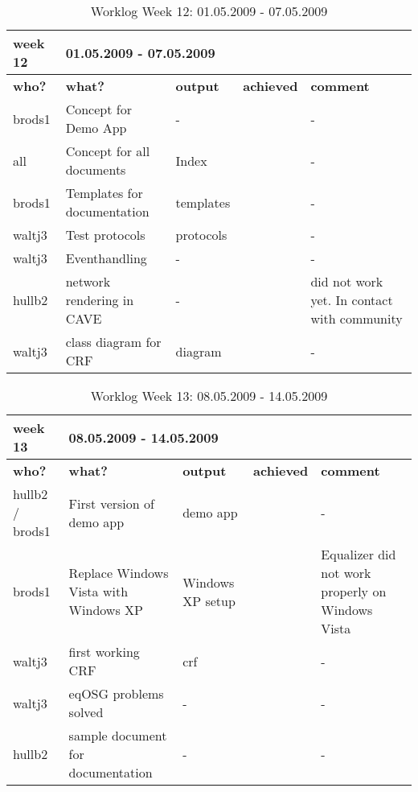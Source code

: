 \begin{table}[H]
	\centering
	\begin{tabular}{|b{}|p{}|p{}|p{}|p{}|}
		\hline \bfseries week 12 & \multicolumn{4}{l|}{\bfseries 01.05.2009 - 07.05.2009} \\
		\hline
		\hline \bfseries who? & \bfseries what? & \bfseries output & \bfseries achieved & \bfseries comment \\ 
		\hline brods1 & Concept for Demo App & \quad\quad- & \tick & \quad\quad- \\
		\hline all & Concept for all documents & Index & \tick & \quad\quad- \\
		\hline brods1 & Templates for documentation & templates & \tick & \quad\quad- \\
		\hline waltj3 & Test protocols & protocols & \cross & \quad\quad- \\
		\hline waltj3 & Eventhandling & - & \tick& \quad\quad-\\
		\hline hullb2 & network rendering in CAVE & \quad\quad- & \cross & did not work yet. In contact with community \\
		\hline waltj3 & class diagram for CRF & diagram & \tick & \quad\quad- \\
		\hline 
	\end{tabular}
	\caption{Worklog Week 12: 01.05.2009 - 07.05.2009}
\end{table}

\begin{table}[H]
	\centering
	\begin{tabular}{|b{}|p{}|p{}|p{}|p{}|}
		\hline \bfseries week 13 & \multicolumn{4}{l|}{\bfseries 08.05.2009 - 14.05.2009} \\
		\hline
		\hline \bfseries who? & \bfseries what? & \bfseries output & \bfseries achieved & \bfseries comment \\ 
		\hline hullb2 / brods1 & First version of demo app & demo app & \tick & \quad\quad- \\
		\hline brods1 & Replace Windows Vista with Windows XP & Windows XP setup & \tick & Equalizer did not work properly on Windows Vista \\
		\hline waltj3 & first working CRF & crf & \tick & \quad\quad- \\
		\hline waltj3 & eqOSG problems solved & \quad\quad- & \tick & \quad\quad- \\
		\hline hullb2 & sample document for documentation & \quad\quad- & \tick & \quad\quad- \\
		\hline
	\end{tabular}
	\caption{Worklog Week 13: 08.05.2009 - 14.05.2009}
\end{table}

